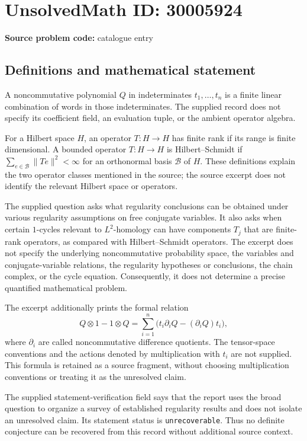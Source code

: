 \documentclass[11pt]{article}
\begin{document}
\section*{UnsolvedMath ID: 30005924}
\textbf{Source problem code:} catalogue entry
\subsection{Definitions and mathematical statement}
A noncommutative polynomial \(Q\) in indeterminates \(t_1,\ldots,t_n\) is a finite linear combination of words in those indeterminates. The supplied record does not specify its coefficient field, an evaluation tuple, or the ambient operator algebra.

For a Hilbert space \(H\), an operator \(T:H\to H\) has finite rank if its range is finite dimensional. A bounded operator \(T:H\to H\) is Hilbert--Schmidt if \(\sum_{e\in\mathcal B}\|Te\|^2<\infty\) for an orthonormal basis \(\mathcal B\) of \(H\). These definitions explain the two operator classes mentioned in the source; the source excerpt does not identify the relevant Hilbert space or operators.

The supplied question asks what regularity conclusions can be obtained under various regularity assumptions on free conjugate variables. It also asks when certain \(1\)-cycles relevant to \(L^2\)-homology can have components \(T_j\) that are finite-rank operators, as compared with Hilbert--Schmidt operators. The excerpt does not specify the underlying noncommutative probability space, the variables and conjugate-variable relations, the regularity hypotheses or conclusions, the chain complex, or the cycle equation. Consequently, it does not determine a precise quantified mathematical problem.

The excerpt additionally prints the formal relation
\[
Q\otimes 1-1\otimes Q
=\sum_{i=1}^{n}\bigl(t_i\partial_iQ-(\partial_iQ)t_i\bigr),
\]
where \(\partial_i\) are called noncommutative difference quotients. The tensor-space conventions and the actions denoted by multiplication with \(t_i\) are not supplied. This formula is retained as a source fragment, without choosing multiplication conventions or treating it as the unresolved claim.

The supplied statement-verification field says that the report uses the broad question to organize a survey of established regularity results and does not isolate an unresolved claim. Its statement status is \texttt{unrecoverable}. Thus no definite conjecture can be recovered from this record without additional source context.
\end{document}
